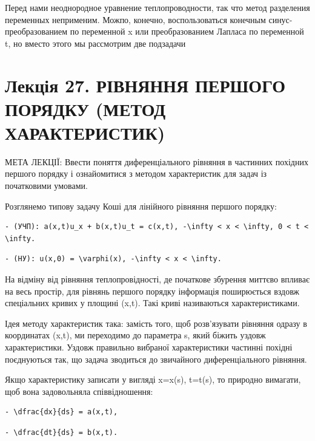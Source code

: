 \documentclass[
  ukrainian,
]{article}
\begin{document}
Перед нами неоднородное уравнение теплопроводности, так что метод
разделения переменных неприменим. Можпо, конечно, воспользоваться
конечным синус-преобразованием по переменной x или преобразованием
Лапласа по переменной t, но вместо этого мы рассмотрим две подзадачи

\section{Лекція 27. РІВНЯННЯ ПЕРШОГО ПОРЯДКУ (МЕТОД
ХАРАКТЕРИСТИК)}\label{ux43bux435ux43aux446ux456ux44f-27.-ux440ux456ux432ux43dux44fux43dux43dux44f-ux43fux435ux440ux448ux43eux433ux43e-ux43fux43eux440ux44fux434ux43aux443-ux43cux435ux442ux43eux434-ux445ux430ux440ux430ux43aux442ux435ux440ux438ux441ux442ux438ux43a}

МЕТА ЛЕКЦІЇ: Ввести поняття диференціального рівняння в частинних
похідних першого порядку і ознайомитися з методом характеристик для
задач із початковими умовами.

Розглянемо типову задачу Коші для лінійного рівняння першого порядку:

\begin{verbatim}
- (УЧП): a(x,t)u_x + b(x,t)u_t = c(x,t), -\infty < x < \infty, 0 < t < \infty.
\end{verbatim}

\begin{verbatim}
- (НУ): u(x,0) = \varphi(x), -\infty < x < \infty.
\end{verbatim}

На відміну від рівняння теплопровідності, де початкове збурення миттєво
впливає на весь простір, для рівнянь першого порядку інформація
поширюється вздовж спеціальних кривих у площині (x,t). Такі криві
називаються характеристиками.

Ідея методу характеристик така: замість того, щоб розв'язувати рівняння
одразу в координатах (x,t), ми переходимо до параметра s, який біжить
уздовж характеристики. Уздовж правильно вибраної характеристики частинні
похідні поєднуються так, що задача зводиться до звичайного
диференціального рівняння.

Якщо характеристику записати у вигляді x=x(s), t=t(s), то природно
вимагати, щоб вона задовольняла співвідношення:

\begin{verbatim}
- \dfrac{dx}{ds} = a(x,t),
\end{verbatim}

\begin{verbatim}
- \dfrac{dt}{ds} = b(x,t).
\end{verbatim}
\end{document}
